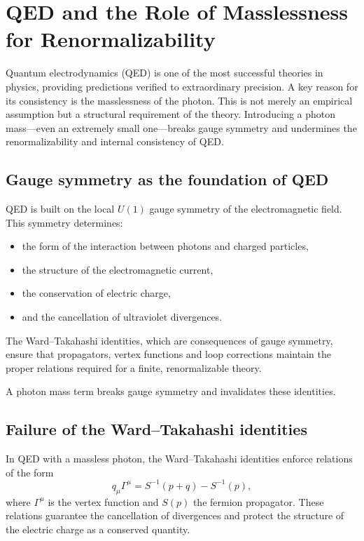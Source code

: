 \section{QED and the Role of Masslessness for Renormalizability}

Quantum electrodynamics (QED) is one of the most successful theories in 
physics, providing predictions verified to extraordinary precision. A key 
reason for its consistency is the masslessness of the photon. This is not 
merely an empirical assumption but a structural requirement of the theory. 
Introducing a photon mass—even an extremely small one—breaks gauge symmetry 
and undermines the renormalizability and internal consistency of QED.

\subsection*{Gauge symmetry as the foundation of QED}

QED is built on the local $U(1)$ gauge symmetry of the electromagnetic 
field. This symmetry determines:

\begin{itemize}
	\item the form of the interaction between photons and charged particles,
	\item the structure of the electromagnetic current,
	\item the conservation of electric charge,
	\item and the cancellation of ultraviolet divergences.
\end{itemize}

The Ward–Takahashi identities, which are consequences of gauge symmetry, 
ensure that propagators, vertex functions and loop corrections maintain the 
proper relations required for a finite, renormalizable theory.

A photon mass term breaks gauge symmetry and invalidates these identities.

\subsection*{Failure of the Ward–Takahashi identities}

In QED with a massless photon, the Ward–Takahashi identities enforce 
relations of the form
\[
q_\mu \Gamma^\mu = S^{-1}(p+q) - S^{-1}(p),
\]
where $\Gamma^\mu$ is the vertex function and $S(p)$ the fermion propagator.
These relations guarantee the cancellation of divergences and protect the 
structure of the electric charge as a conserved quantity.


